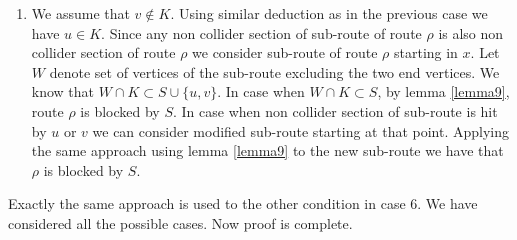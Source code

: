 \begin{prf}
\begin{enumerate}
\begin{enumerate}
					
				\item We assume that $v \not\in K$. Using similar deduction as in the previous case we have $u \in K$. 
					Since any non collider section of sub-route of route $\rho$ is also non collider section of 
					route $\rho$ we consider sub-route of route $\rho$ starting in $x$. Let $W$ denote set of vertices
					of the sub-route excluding the two end vertices. We know that $W \cap K \subset S \cup \{ u, v \}$.
					In case when $W \cap K \subset S$, by lemma \ref{lemma9}, route $\rho$ is blocked by $S$.
					In case when non collider section of sub-route is hit by $u$ or $v$ we can consider modified sub-route
					starting at that point. Applying the same approach using lemma \ref{lemma9} to the new sub-route 
					we have that $\rho$ is blocked by $S$.

			\end{enumerate}
			Exactly the same approach is used to the other condition in case 6.
			We have considered all the possible cases. Now proof is complete.
			\QED

	\end{enumerate}
	
	
\end{prf}











